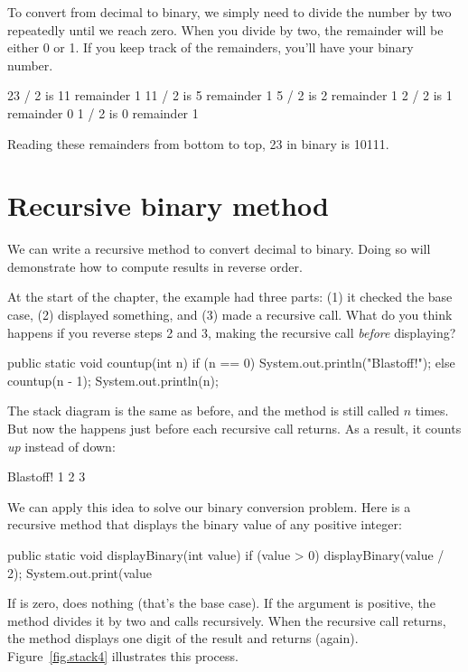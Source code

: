 To convert from decimal to binary, we simply need to divide the number by two repeatedly until we reach zero.
When you divide by two, the remainder will be either 0 or 1.
If you keep track of the remainders, you'll have your binary number.

\begin{stdout}
23 / 2 is 11 remainder 1
11 / 2 is  5 remainder 1
 5 / 2 is  2 remainder 1
 2 / 2 is  1 remainder 0
 1 / 2 is  0 remainder 1
\end{stdout}

Reading these remainders from bottom to top, 23 in binary is 10111.


\section{Recursive binary method}

We can write a recursive method to convert decimal to binary.
Doing so will demonstrate how to compute results in reverse order.

At the start of the chapter, the  example had three parts: (1) it checked the base case, (2) displayed something, and (3) made a recursive call.
What do you think happens if you reverse steps 2 and 3, making the recursive call {\em before} displaying?

\begin{code}
public static void countup(int n) {
    if (n == 0) {
        System.out.println("Blastoff!");
    } else {
        countup(n - 1);
        System.out.println(n);
    }
}
\end{code}

The stack diagram is the same as before, and the method is still called $n$ times.
But now the  happens just before each recursive call returns.
As a result, it counts {\em up} instead of down:

\begin{stdout}
Blastoff!
1
2
3
\end{stdout}

We can apply this idea to solve our binary conversion problem.
Here is a recursive method that displays the binary value of any positive integer:

\begin{code}
public static void displayBinary(int value) {
    if (value > 0) {
        displayBinary(value / 2);
        System.out.print(value %
    }
}
\end{code}

If  is zero,  does nothing (that's the base case).
If the argument is positive, the method divides it by two and calls  recursively.
When the recursive call returns, the method displays one digit of the result and returns (again).
Figure~\ref{fig.stack4} illustrates this process.

